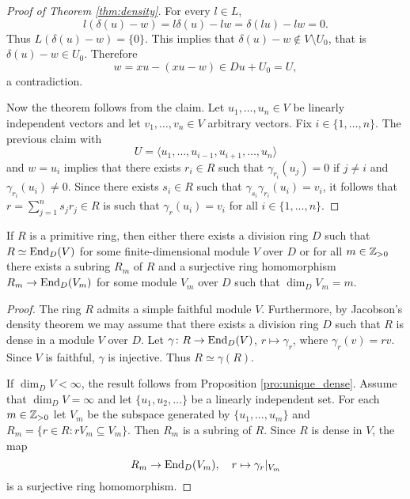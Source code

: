 \begin{proof}[Proof of Theorem \ref{thm:density}]
	For every $l\in L$,  
	\[
		l(\delta(u)-w)=l\delta(u)-lw=\delta(lu)-lw=0.
	\]
	Thus $L(\delta(u)-w)=\{0\}$. This implies that $\delta(u)-w\not\in V\setminus U_0$, 
	that is $\delta(u)-w\in U_0$. Therefore  
	\[
		w=xu-(xu-w)\in Du+U_0=U,
	\]
	a contradiction.
	
	Now the theorem follows from the claim. Let 
	$u_1,\dots,u_n\in V$ be linearly independent vectors and let 
	$v_1,\dots,v_n\in V$ arbitrary vectors. Fix $i\in\{1,\dots,n\}$. 
	The previous claim with 
	\[
		U=\langle u_1,\dots,u_{i-1},u_{i+1},\dots,u_n\rangle
	\]
	and $w=u_i$ implies that there exists $r_i\in R$ such that $\gamma_{r_i}(u_j)=0$ if 
	$j\ne i$ and $\gamma_{r_i}(u_i)\ne 0$. Since there exists $s_i\in R$ such that 
	$\gamma_{s_i}\gamma_{r_i}(u_i)=v_i$, it follows that 
	$r=\sum_{j=1}^n s_jr_j\in R$ is such that $\gamma_r(u_i)=v_i$ for all 
	$i\in\{1,\dots,n\}$.
\end{proof}


\begin{corollary}
	If $R$ is a primitive ring, then either there exists a division ring $D$
	such that $R\simeq\operatorname{End}_D(V)$ for some finite-dimensional module $V$ over $D$ or 
	for all $m\in\mathbb{Z}_{>0}$ there exists a subring $R_m$ of 
	$R$ and a surjective ring homomorphism $R_m\to\operatorname{End}_D(V_m)$ for some module 
	$V_m$ over $D$ such that $\dim_DV_m=m$.
\end{corollary}

\begin{proof}
	The ring $R$ admits a simple faithful module $V$. Furthermore, by Jacobson's density 
	theorem we may assume that there exists a division ring $D$ 
	such that $R$ is dense in a module $V$ over $D$. 
	Let $\gamma\colon R\to\operatorname{End}_D(V)$, $r\mapsto\gamma_r$, where 
	$\gamma_r(v)=rv$. Since $V$ is faithful, $\gamma$ is injective. Thus 
	$R\simeq\gamma(R)$. 

	If $\dim_DV<\infty$, the result follows from Proposition \ref{pro:unique_dense}. 
	Assume that $\dim_DV=\infty$ and let $\{u_1,u_2,\dots\}$ be a linearly independent set. 
	For each $m\in\mathbb{Z}_{>0}$ let $V_m$ be the subspace generated by $\{u_1,\dots,u_m\}$
	and $R_m=\{r\in R:rV_m\subseteq V_m\}$. Then $R_m$ is a subring of $R$. 
	Since $R$ is dense in $V$, the map 
	\[
		R_m\to \operatorname{End}_D(V_m),\quad
		r\mapsto\gamma_r|_{V_m}
	\]
	is a surjective ring homomorphism. 
\end{proof}


